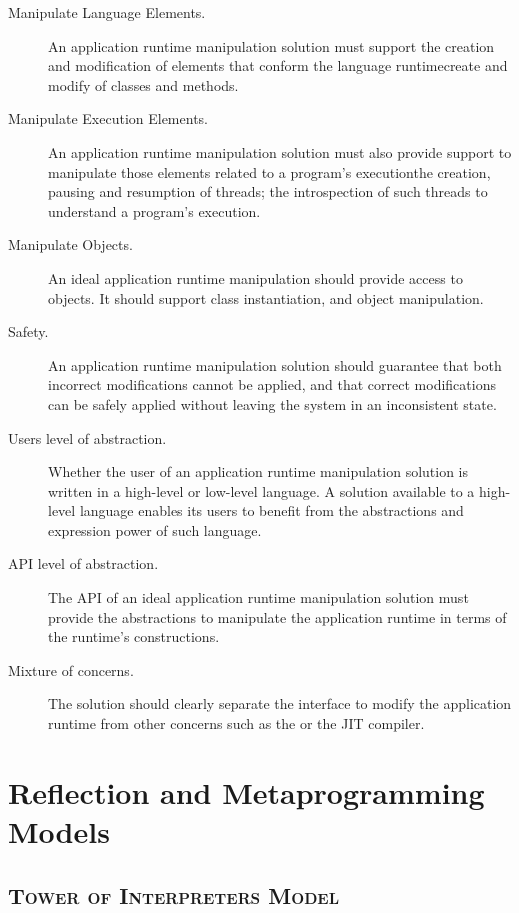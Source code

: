 \begin{description}

\item[Manipulate Language Elements.] An application runtime manipulation solution must support the creation and modification of elements that conform the language runtime\eg create and modify of classes and methods.
\item[Manipulate Execution Elements.] An application runtime manipulation solution must also provide support to manipulate those elements related to a program's execution\eg the creation, pausing and resumption of threads; the introspection of such threads to understand a program's execution.
\item[Manipulate Objects.] An ideal application runtime manipulation should provide access to objects. It should support class instantiation, and object manipulation.
\item[Safety.] An application runtime manipulation solution should guarantee that both incorrect modifications cannot be applied, and that correct modifications can be safely applied without leaving the system in an inconsistent state.

\item[Users level of abstraction.] Whether the user of an application runtime manipulation solution is written in a high-level or low-level language. A solution available to a high-level language enables its users to benefit from the abstractions and expression power of such language.

\item[API level of abstraction.] The API of an ideal application runtime manipulation solution must provide the abstractions to manipulate the application runtime in terms of the runtime's constructions.

\item[Mixture of concerns.] The solution should clearly separate the interface to modify the application runtime from other concerns such as the \GC or the JIT compiler.

\end{description}

\section{Reflection and Metaprogramming Models}\label{sec:related_work_changing}

\subsection*{\textsc{Tower of Interpreters Model}}

